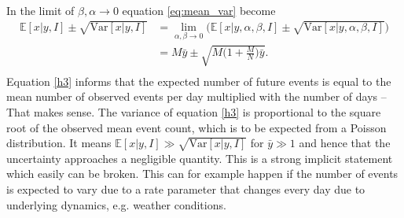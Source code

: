 \begin{example}
\begin{equation}
\begin{split}
		\end{split}
	\end{equation}
	In the limit of $\beta,\alpha\rightarrow 0$ equation \eqref{eq:mean_var} become
	\begin{equation}
		\begin{split}
			\mathbb{E}[x|y,I]\pm \sqrt{\text{Var}[x|y,I]} & = \lim\limits_{\alpha,\beta\rightarrow 0}\big(\mathbb{E}[x|y,\alpha,\beta,I]\pm \sqrt{\text{Var}[x|y,\alpha,\beta,I]}\big)\\
			& = M\bar{y}\pm \sqrt{M\big(1+\frac{M}{N}\big)\bar{y}}.\\ 
		\end{split}
		\label{h3}
	\end{equation}
	Equation \eqref{h3} informs that the expected number of future events is equal to the mean number of observed events per day multiplied with the number of days -- That makes sense. The variance of equation \eqref{h3} is proportional to the square root of the observed mean event count, which is to be expected from a Poisson distribution. It means $\mathbb{E}[x|y,I]\gg \sqrt{\text{Var}[x|y,I]}$ for $\bar{y}\gg 1$ and hence that the uncertainty approaches a negligible quantity. This is a strong implicit statement which easily can be broken. This can for example happen if the number of events is expected to vary due to a rate parameter that changes every day due to underlying dynamics, e.g. weather conditions. 
	
	

\end{example}
